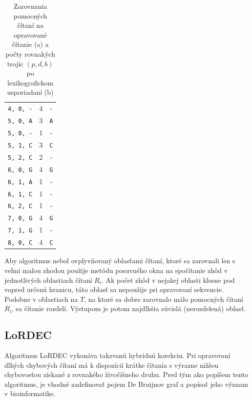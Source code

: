 \begin{table}
\begin{subtable}{.5\linewidth}
\begin{tabular}{ l c c }
           	 \verb|4, 0, -| & 4 &  \verb|-| \\
           	 \verb|5, 0, A| & 3 &  \verb|A| \\
           	 \verb|5, 0, -| & 1 &  \verb|-| \\
           	 \verb|5, 1, C| & 3 &  \verb|C| \\
           	 \verb|5, 2, C| & 2 &  \verb|-| \\
           	 \verb|6, 0, G| & 4 &  \verb|G| \\
           	 \verb|6, 1, A| & 1 &  \verb|-| \\
           	 \verb|6, 1, C| & 1 &  \verb|-| \\
           	 \verb|6, 2, C| & 1 &  \verb|-| \\
           	 \verb|7, 0, G| & 4 &  \verb|G| \\
           	 \verb|7, 1, G| & 1 &  \verb|-| \\
           	 \verb|8, 0, C| & 4 &  \verb|C| \\
           	 \hline
        \end{tabular}
        \caption{}
        \label{subtable:suffix_array_suffixes_lexi}
    \end{subtable}
    \caption{Zarovnania pomocných čítaní na opravované čítanie (a) a počty rovnakých trojíc $(p, d, b)$ po lexikografickom usporiadaní (b)}
    \label{table:falconsense_example}
\end{table}

Aby algoritmus nebol ovplyvňovaný oblasťami čítaní, ktoré sa zarovnali len s veľmi malou zhodou použije metódu posuvného okna na spočítanie zhôd v jednotlivých oblastiach čítaní $R_i$. Ak počet zhôd v nejakej oblasti klesne pod vopred určenú hranicu, táto oblasť sa nepoužije pri opravovaní sekvencie. Podobne v oblastiach na $T$, na ktoré sa dobre zarovnalo málo pomocných čítaní $R_i$, sa čítanie rozdelí. Výstupom je potom najdlhšia súvislá (nerozdelená) oblasť.

\subsection{LoRDEC}

Algoritmus LoRDEC vykonáva takzvanú hybridnú korekciu. Pri opravovaní dlhých chybových čítaní má k dispozícii krátke čítania s výrazne nižšou chybovosťou získané z rovnakého živočíšneho druhu. Pred tým ako popíšem tento algoritmus, je vhodné zadefinovať pojem De Bruijnov graf a popísať jeho význam v bioinformatike. 

